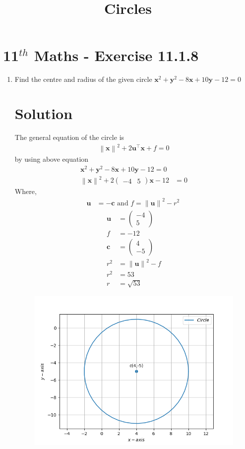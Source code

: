 \documentclass[12pt]{article}
\providecommand{\norm}[1]{\left\lVert#1\right\rVert}
\newcommand{\myvec}[1]{\ensuremath{\begin{pmatrix}#1\end{pmatrix}}}
\let\vec\mathbf
\begin{document}
\begin{center}
\title{\textbf{Circles}}
\date{\vspace{-5ex}} %
\maketitle
\end{center}
\setcounter{page}{1}
\section{11$^{th}$ Maths - Exercise 11.1.8}

\begin{enumerate}
\item Find the centre and radius of the given circle $\vec{x}^2+\vec{y}^2-8\vec{x}+10\vec{y}-12=0$
\section{Solution}
The general equation of  the circle is 
\begin{align}
	\norm{\vec{x}}^{2} + 2\vec{u}^{\top}\vec{x} + f = 0
\end{align}
by using above equation
\begin{align}
	\vec{x}^2+\vec{y}^2-8\vec{x}+10\vec{y}-12=0\\
	\norm{\vec{x}}^2+2\myvec{-4 & 5}\vec{x}-12&=0
\end{align}	
Where,
\begin{align}
	\vec{u} &= -\vec{c} \text{ and } f = \norm{\vec{u}}^{2} - r^{2}\
\end{align}
\begin{align}
 \vec{u}&=\myvec{-4\\5}\\
 f&=-12\\
\vec{c}&=\myvec{4 \\ -5}\\
r^2&=\norm{\vec{u}}^2-f\\
r^2&= 53\\
r&=\sqrt{53}
\end{align}
\begin{figure}[!h]
	\begin{center} 
	   \includegraphics[width=\columnwidth]{figs/11.1.8.png}

\end{center}
\end{figure}
\end{enumerate}
\end{document}
